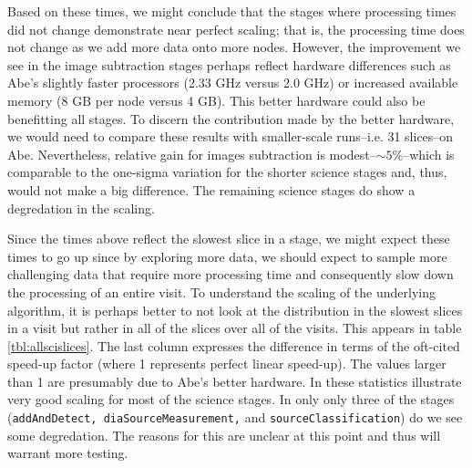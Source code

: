 Based on these times, we might conclude that the stages where
processing times did not change demonstrate near perfect scaling; that
is, the processing time does not change as we add more data onto more
nodes.  However, the improvement we see in the image subtraction
stages perhaps reflect hardware differences such as Abe's slightly
faster processors (2.33 GHz versus 2.0 GHz) or increased available
memory (8 GB per node versus 4 GB).  This better hardware could also
be benefitting all stages.  To discern the contribution made by the
better hardware, we would need to compare these results with
smaller-scale runs--i.e. 31 slices--on Abe.  Nevertheless, relative
gain for images subtraction is modest--$\sim 5\%$--which is comparable
to the one-sigma variation for the shorter science stages and, thus,
would not make a big difference.  The remaining science stages do show
a degredation in the scaling.  

Since the times above reflect the slowest slice in a stage, we might
expect these times to go up since by exploring more data, we should
expect to sample more challenging data that require more processing
time and consequently slow down the processing of an entire visit.  To
understand the scaling of the underlying algorithm, it is perhaps
better to not look at the distribution in the slowest slices in a
visit but rather in all of the slices over all of the visits.  This
appears in table \ref{tbl:allscislices}.  The last column expresses
the difference in terms of the oft-cited speed-up factor (where 1
represents perfect linear speed-up).  The values larger than 1 are
presumably due to Abe's better hardware.  In these statistics
illustrate very good scaling for most of the science stages.  In only 
only three of the stages ({\tt addAndDetect, diaSourceMeasurement,}
and {\tt sourceClassification}) do we see some degredation.  The
reasons for this are unclear at this point and thus will warrant more
testing.  


